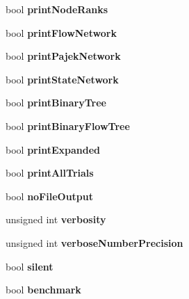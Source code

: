 \begin{DoxyCompactItemize}
bool {\bfseries print\+Node\+Ranks}
\item 
\mbox{\label{structConfig_aad5db9bfd4cb5bcd61539173f916b5f5}} 
bool {\bfseries print\+Flow\+Network}
\item 
\mbox{\label{structConfig_a7789b19613fd5bea921698875930cc2d}} 
bool {\bfseries print\+Pajek\+Network}
\item 
\mbox{\label{structConfig_aa490220d1ae74a37de976becade513e9}} 
bool {\bfseries print\+State\+Network}
\item 
\mbox{\label{structConfig_a284aa3da9cce03bc81a2d951ea975d27}} 
bool {\bfseries print\+Binary\+Tree}
\item 
\mbox{\label{structConfig_a9d9445bd00ccbaf2e8f6a06fc8513b80}} 
bool {\bfseries print\+Binary\+Flow\+Tree}
\item 
\mbox{\label{structConfig_a60df976b25dd0934e7f840de54d72c65}} 
bool {\bfseries print\+Expanded}
\item 
\mbox{\label{structConfig_a677f2629326072e04e78baee6f9894b9}} 
bool {\bfseries print\+All\+Trials}
\item 
\mbox{\label{structConfig_a8985726700b751607e281d3ad887ea27}} 
bool {\bfseries no\+File\+Output}
\item 
\mbox{\label{structConfig_a7b34d50401f5ce2f226a0b0590efa581}} 
unsigned int {\bfseries verbosity}
\item 
\mbox{\label{structConfig_a2892665c3bc8ee427875132d6b263429}} 
unsigned int {\bfseries verbose\+Number\+Precision}
\item 
\mbox{\label{structConfig_a56db795332d7d15497c9958f14148f75}} 
bool {\bfseries silent}
\item 
\mbox{\label{structConfig_a96f2fe1aa9e16769ea2635e28f136945}} 
bool {\bfseries benchmark}
\item 
\mbox{\label{structConfig_ae60ed2db316d163c0dd7a72a60720a47}} 

\end{DoxyCompactItemize}
